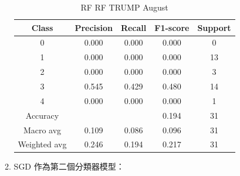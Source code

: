 \begin{enumerate}
\begin{enumerate}
\begin{table}[H]
                \vspace{1em}
                
                \scriptsize
                \begin{tabular}{c|cccc}
                \hline
                Class & Precision & Recall & F1-score & Support \\
                \hline
                0 & 0.000 & 0.000 & 0.000 & 0 \\
                1 & 0.000 & 0.000 & 0.000 & 13 \\
                2 & 0.000 & 0.000 & 0.000 & 3 \\
                3 & 0.545 & 0.429 & 0.480 & 14 \\
                4 & 0.000 & 0.000 & 0.000 & 1 \\
                \hline
                Accuracy &       &      & 0.194 & 31 \\
                Macro avg & 0.109 & 0.086 & 0.096 & 31 \\
                Weighted avg & 0.246 & 0.194 & 0.217 & 31 \\
                \hline
                \end{tabular}
                \caption{RF RF TRUMP August}
                \label{tab:classifier_2_report_rf_rf_trump_filtered_aug}
                \end{table}




                \pagebreak
    
                \item SGD 作為第二個分類器模型：


\end{enumerate}
\end{enumerate}
